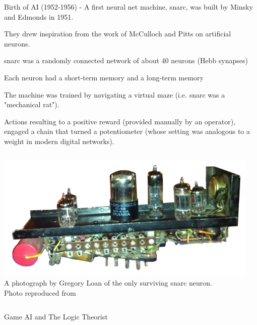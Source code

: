 \begin{frame}[t,allowframebreaks]{Birth of AI (1952-1956) -}
A first neural net machine, \gls{snarc}, 
was built by \gls{Minsky} and \gls{Edmonds} in 1951.

They drew inspiration from the work of 
\gls{McCulloch} and \gls{Pitts} on
artificial neurons.

\gls{snarc} was a randomly connected network of about 40 neurons (Hebb synapses)

Each neuron had a short-term memory and a long-term memory

The machine was trained by navigating a virtual maze (i.e. \gls{snarc} was a "mechanical rat").

Actions resulting to a positive reward (provided manually by an operator), 
engaged a chain that turned a potentiometer (whose setting was analogous to a weight in modern digital networks).

\begin{columns}
    \begin{column}{0.45\textwidth}
     \begin{center}
        \includegraphics[width=0.99\textwidth]
        {./images/snarc/gregoryloan_snarc_hebbsynapse.png}\\
     {\scriptsize 
      A photograph by Gregory Loan of the only surviving \gls{snarc} neuron.\\
      \color{col:attribution} 
      Photo reproduced from \cite{CyberneticZoo:1951MazeSolver}}\\
     \end{center}
    \end{column}
    \begin{column}{0.55\textwidth}
    \end{column}
\end{columns}

\framebreak

Game AI and The Logic Theorist

\end{frame}




